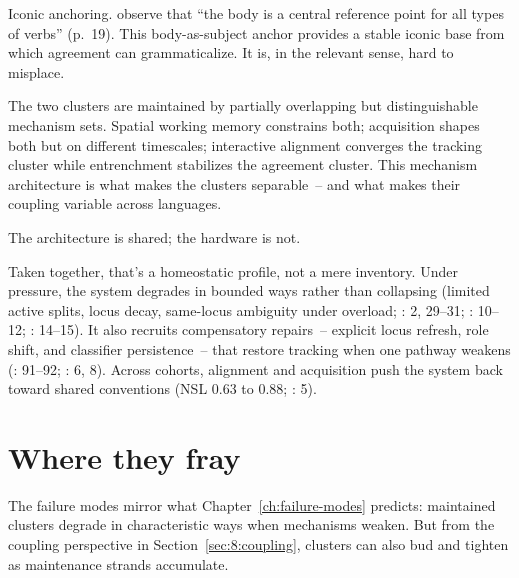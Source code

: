 Iconic anchoring. \textcite{padden2010} observe that \enquote{the body is a central reference point for all types of verbs} (p.~19). This body-as-subject anchor provides a stable iconic base from which agreement can grammaticalize. It is, in the relevant sense, hard to misplace.

The two clusters are maintained by partially overlapping but distinguishable mechanism sets. Spatial working memory constrains both; acquisition shapes both but on different timescales; interactive alignment converges the tracking cluster while entrenchment stabilizes the agreement cluster. This mechanism architecture is what makes the clusters separable~-- and what makes their coupling variable across languages.

The architecture is shared; the hardware is not.

Taken together, that's a homeostatic profile, not a mere inventory. Under pressure, the system degrades in bounded ways rather than collapsing (limited active splits, locus decay, same-locus ambiguity under overload; \citealt{steinbach2016}: 2, 29--31; \citealt{schlenker2017}: 10--12; \citealt{kuhn2016}: 14--15). It also recruits compensatory repairs~-- explicit locus refresh, role shift, and classifier persistence~-- that restore tracking when one pathway weakens (\citealt{sandler2006}: 91--92; \citealt{garcia2020}: 6, 8). Across cohorts, alignment and acquisition push the system back toward shared conventions (NSL 0.63 to 0.88; \citealt{senghas2001}: 5).


\section{Where they fray}
\label{sec:sign:failure}

The failure modes mirror what Chapter~\ref{ch:failure-modes} predicts: maintained clusters degrade in characteristic ways when mechanisms weaken. But from the coupling perspective in Section~\ref{sec:8:coupling}, clusters can also bud and tighten as maintenance strands accumulate.


